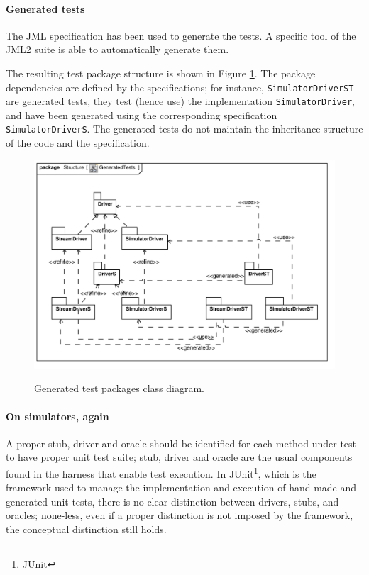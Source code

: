 \documentclass{article} \usepackage{times}
\newcommand{\myhref}[2]{\ifpdf\href{#1}{#2}\else\htmladdnormallinkfoot{#2}{#1}\fi}
\newcommand{\lil}[1]{\texttt{\lstinline|#1|}}
\begin{document}
\paragraph*{Generated tests}

The JML specification has been used to generate the tests.  A specific
tool of the JML2 suite is able to automatically generate
them\cite{Cheon-Leavens02}.

The resulting test package structure is shown in Figure
\ref{fig:class_diagram_generatedtest}.  The package dependencies are
defined by the specifications; for instance, \lil{SimulatorDriverST}
are generated tests, they test (hence use) the implementation
\lil{SimulatorDriver}, and have been generated using the corresponding
specification \lil{SimulatorDriverS}.  The generated tests do not
maintain the inheritance structure of the code and the specification.

\begin{figure}[htb!]
  \centering
  \includegraphics[scale=0.7]{UML_model/Class_Diagram__Structure__GeneratedTests}
  \label{fig:class_diagram_generatedtest}
  \caption{Generated test packages class diagram.}
\end{figure}

\paragraph*{On simulators, again}

A proper stub, driver and oracle should be identified for each method
under test to have proper unit test suite; stub, driver and oracle are
the usual components found in the harness that enable test
execution\cite{Binder1999}.  In
JUnit\footnote{\myhref{http://www.junit.org/}{JUnit}}, which is the
framework used to manage the implementation and execution of hand made
and generated unit tests, there is no clear distinction between
drivers, stubs, and oracles; none-less, even if a proper distinction
is not imposed by the framework, the conceptual distinction still
holds.
\end{document}
